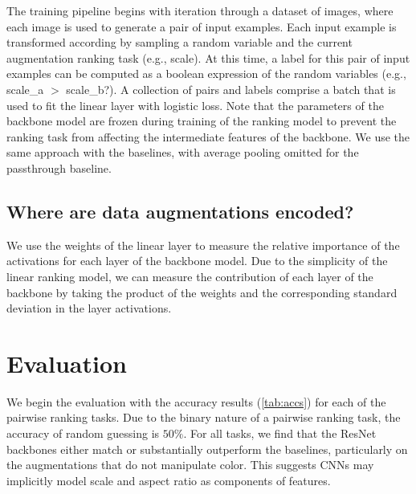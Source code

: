 The training pipeline begins with iteration through a dataset of images, where each image is used to generate a pair of input examples.
Each input example is transformed according by sampling a random variable and the current augmentation ranking task (e.g., scale).
At this time, a label for this pair of input examples can be computed as a boolean expression of the random variables (e.g., scale\_a $>$ scale\_b?).
A collection of pairs and labels comprise a batch that is used to fit the linear layer with logistic loss.
Note that the parameters of the backbone model are frozen during training of the ranking model to prevent the ranking task from affecting the intermediate features of the backbone.
We use the same approach with the baselines, with average pooling omitted for the passthrough baseline.

\subsection{Where are data augmentations encoded?}
We use the weights of the linear layer to measure the relative importance of the activations for each layer of the backbone model.
Due to the simplicity of the linear ranking model, we can measure the contribution of each layer of the backbone by taking the product of the weights and the corresponding standard deviation in the layer activations.

\section{Evaluation}
We begin the evaluation with the accuracy results (\autoref{tab:accs}) for each of the pairwise ranking tasks.
Due to the binary nature of a pairwise ranking task, the accuracy of random guessing is $50\%$.
For all tasks, we find that the ResNet backbones either match or substantially outperform the baselines, particularly on the augmentations that do not manipulate color.  This suggests CNNs may implicitly model scale and aspect ratio as components of features.

